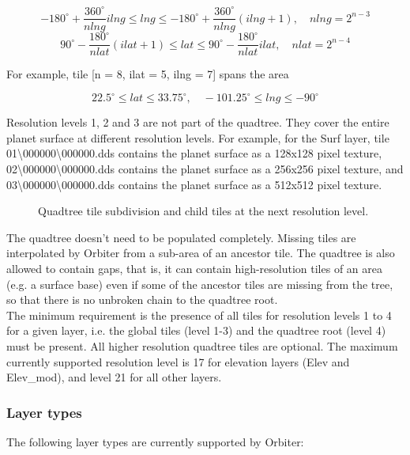 \documentclass[Orbiter Developer Manual.tex]{subfiles}
\begin{document}
\[ -180^{\circ} + \frac{360^{\circ}}{nlng}ilng \leq lng \leq -180^{\circ} + \frac{360^{\circ}}{nlng}(ilng + 1), \quad nlng = 2^{n - 3} \]
\[ 90^{\circ} - \frac{180^{\circ}}{nlat}(ilat + 1) \leq lat \leq 90^{\circ} - \frac{180^{\circ}}{nlat}ilat, \quad nlat = 2^{n - 4} \]

\noindent
For example, tile [n = 8, ilat = 5, ilng = 7] spans the area

\[ 22.5^{\circ} \leq lat \leq 33.75^{\circ}, \quad -101.25^{\circ} \leq lng \leq -90^{\circ} \]

\noindent
Resolution levels 1, 2 and 3 are not part of the quadtree. They cover the entire planet surface at different resolution levels. For example, for the Surf layer, tile 01\textbackslash 000000\textbackslash 000000.dds contains the planet surface as a 128x128 pixel texture, 02\textbackslash 000000\textbackslash 000000.dds contains the planet surface as a 256x256 pixel texture, and  03\textbackslash 000000\textbackslash 000000.dds contains the planet surface as a 512x512 pixel texture.

\begin{figure}[H]
	\centering
	\caption{Quadtree tile subdivision and child tiles at the next resolution level.}
\end{figure}

\noindent
The quadtree doesn't need to be populated completely. Missing tiles are interpolated by Orbiter from a sub-area of an ancestor tile. The quadtree is also allowed to contain gaps, that is, it can contain high-resolution tiles of an area (e.g. a surface base) even if some of the ancestor tiles are missing from the tree, so that there is no unbroken chain to the quadtree root.\\
The minimum requirement is the presence of all tiles for resolution levels 1 to 4 for a given layer, i.e. the global tiles (level 1-3) and the quadtree root (level 4) must be present. All higher resolution quadtree tiles are optional. The maximum currently supported resolution level is 17 for elevation layers (Elev and Elev\_mod), and level 21 for all other layers.



\subsubsection{Layer types}
The following layer types are currently supported by Orbiter:\\
\end{document}
